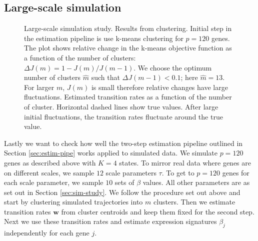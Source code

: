 \subsection{Large-scale simulation}
\label{sec:large-scale-model}

\begin{figure}
  \centering
  \caption{Large-scale simulation study. Results from clustering.  Initial step in the estimation pipeline is use k-means clustering for $p=120$ genes. The plot shows relative change in the k-means objective function as a function of the number of clusters: $\Delta J(m) = 1 - J(m) / J(m - 1)$. We choose the optimum number of clusters $\hat{m}$ such that $\Delta J(m - 1) < 0.1$; here $\hat{m} = 13$. For larger $m$, $J(m)$ is small therefore relative changes have large fluctuations.  Estimated transition rates as a function of the number of cluster. Horizontal dashed lines show true values. After large initial fluctuations, the transition rates fluctuate around the true value.}
  \label{fig:lrg-sim-clust}
\end{figure}


Lastly we want to check how well the two-step estimation pipeline outlined in Section \ref{sec:estim-pipe} works applied to simulated data. We simulate $p=120$ genes as described above with $K=4$ states. To mirror real data where genes are on different scales, we sample $12$ scale parameters $\tau$. To get to $p=120$ genes for each scale parameter, we sample $10$ sets of $\beta$ values. All other parameters are as set out in Section \ref{sec:sim-study}. We follow the procedure set out above and start by clustering simulated trajectories into $m$ clusters. Then we estimate transition rates $\mathbf{w}$ from cluster centroids and keep them fixed for the second step. Next we use these transition rates and estimate expression signatures $\beta_j$ independently for each gene $j$.

